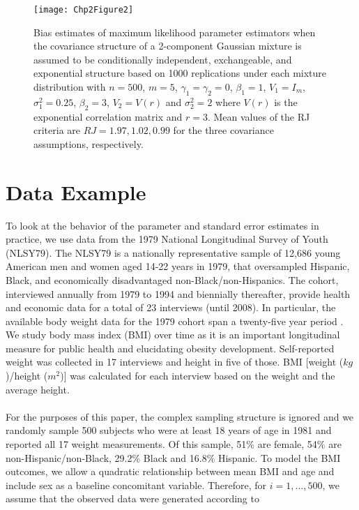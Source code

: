 \documentclass[10pt]{article}
\begin{document}
\begin{figure}
\begin{center}
\texttt{[image: Chp2Figure2]}
\end{center}
\caption{Bias estimates of maximum likelihood parameter estimators when the covariance structure of a 2-component Gaussian mixture is assumed to be conditionally independent, exchangeable, and exponential structure based on 1000 replications under each mixture distribution with $n=500$, $m=5$, $\gamma_1=\gamma_2=0$, $\beta_{1}=1$, $V_1=I_{m}$, $\sigma_1^{2}=0.25$, $\beta_2=3$, $V_2=V(r)$ and $\sigma_2^{2}=2$ where $V(r)$ is the exponential correlation matrix and $r=3$. Mean values of the RJ criteria are $RJ = 1.97, 1.02, 0.99$ for the three covariance assumptions, respectively.}
\label{fig:2}
\end{figure}
\section{Data Example}
To look at the behavior of the parameter and standard error estimates in practice, we use data from the 1979 National Longitudinal Survey of Youth (NLSY79). The NLSY79 is a nationally representative sample of 12,686 young American men and women aged 14-22 years in 1979, that oversampled Hispanic, Black, and economically disadvantaged non-Black/non-Hispanics. The cohort, interviewed annually from 1979 to 1994 and biennially thereafter, provide health and economic data for a total of 23 interviews (until 2008).  In particular, the available body weight data for the 1979 cohort span a twenty-five year period \cite{ostbye2011}. We study body mass index (BMI) over time as it is an important longitudinal measure for public health and elucidating obesity development.  Self-reported weight was collected in 17 interviews and height in five of those. BMI [weight ($kg$)/height ($m^{2}$)] was calculated for each interview based on the weight and the average height.\\\\
For the purposes of this paper, the complex sampling structure is ignored and we randomly sample 500 subjects who were at least 18 years of age in 1981 and reported all 17 weight measurements. Of this sample, 51\% are female, 54\% are non-Hispanic/non-Black, 29.2\% Black and 16.8\% Hispanic. To model the BMI outcomes, we allow a quadratic relationship between mean BMI and age and include sex as a baseline concomitant variable. Therefore, for $i=1,...,500$, we assume that the observed data were generated according to
\end{document}
